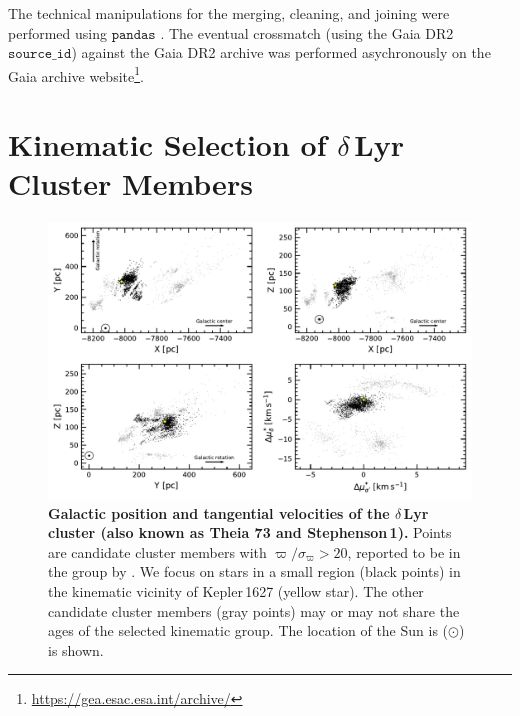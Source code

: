 \documentclass[12pt,modern,twocolumn,tighten]{aastex63}
\begin{document}
The technical manipulations for the merging, cleaning, and joining
were performed using $\texttt{pandas}$
\citep{mckinney-proc-scipy-2010}.  The eventual crossmatch (using the
Gaia DR2 $\texttt{source\_id}$) against the Gaia DR2 archive was performed
asychronously on the Gaia archive
website\footnote{\url{https://gea.esac.esa.int/archive/}}.


\section{Kinematic Selection of $\delta$\,Lyr Cluster Members}

\begin{figure}[t]
	\begin{center}
		\leavevmode
		\includegraphics[width=1\textwidth]{f1.pdf}
	\end{center}
	\vspace{-0.7cm}
	\caption{
		{\bf Galactic position and tangential velocities of the
			$\delta$\,Lyr cluster (also known as Theia 73 and Stephenson\,1).}  Points are
		candidate cluster members with $\varpi/\sigma_\varpi > 20$, reported
		to be in the group by \citet{kounkel_untangling_2019}.  We focus
		on stars in a small region (black points) in the kinematic
		vicinity of Kepler\,1627 (yellow star).  The other candidate cluster
		members (gray points) may or may not share the ages of the selected
		kinematic group.  The location of the Sun is ($\odot$) is shown.
		\label{fig:XYZvtang}
	}
\end{figure}
\end{document}
